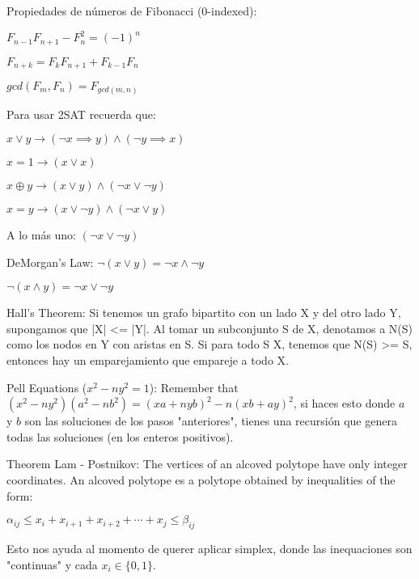 {    Propiedades de números de Fibonacci (0-indexed): 

    \begin{center}
        $F_{n-1}F_{n+1} - F_n^2 = (-1)^n$

        $F_{n+k} = F_kF_{n+1} + F_{k-1}F_n$

        $gcd(F_m, F_n) = F_{gcd(m,n)}$
    \end{center}


    Para usar 2SAT recuerda que:

    \begin{center}
        $x \lor y     \longrightarrow (\lnot x \implies y) \land (\lnot y \implies x)$

        $x = 1        \longrightarrow (x \lor x)$

        $x \oplus y   \longrightarrow (x \lor y) \land (\lnot x \lor \lnot y)$

        $x = y        \longrightarrow (x \lor \lnot y) \land (\lnot x \lor y)$

        A lo más uno:
        $(\lnot x \lor \lnot y)$


        DeMorgan's Law:
        $\lnot (x \lor y)  = \lnot x \land \lnot y$

        $\lnot (x \land y) = \lnot x \lor \lnot y$
    \end{center}
    
    Hall's Theorem: Si tenemos un grafo bipartito con un lado X y del otro lado Y, supongamos que |X| <= |Y|. Al tomar un subconjunto S de X, denotamos a N(S) como los nodos en Y con aristas en S. Si para todo S \subseteq X, tenemos que N(S) >= S, entonces hay un emparejamiento que empareje a todo X.

    Pell Equations ($x^2 - n y^2 = 1$): Remember that $(x^2 - n y^2)(a^2 - n b^2) = (xa + nyb)^2 - n(xb + ay)^2$, si haces esto donde $a$ y $b$ son las soluciones de los pasos "anteriores", tienes una recursión que genera todas las soluciones (en los enteros positivos).

    Theorem Lam - Postnikov: The vertices of an alcoved polytope have only integer coordinates. An alcoved polytope es a polytope obtained by inequalities of the form:

    $\alpha_{ij} \leq x_i + x_{i+1} + x_{i+2} + \cdots + x_j \leq \beta_{ij}$

    Esto nos ayuda al momento de querer aplicar simplex, donde las inequaciones son "continuas" y cada $x_i \in \{0, 1\}$.
}